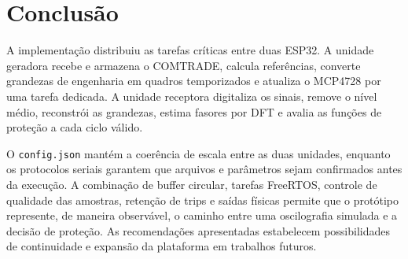 \section{Conclusão}

A implementação distribuiu as tarefas críticas entre duas ESP32. A unidade geradora recebe e armazena o COMTRADE, calcula referências, converte grandezas de engenharia em quadros temporizados e atualiza o MCP4728 por uma tarefa dedicada. A unidade receptora digitaliza os sinais, remove o nível médio, reconstrói as grandezas, estima fasores por DFT e avalia as funções de proteção a cada ciclo válido.

O \texttt{config.json} mantém a coerência de escala entre as duas unidades, enquanto os protocolos seriais garantem que arquivos e parâmetros sejam confirmados antes da execução. A combinação de buffer circular, tarefas FreeRTOS, controle de qualidade das amostras, retenção de trips e saídas físicas permite que o protótipo represente, de maneira observável, o caminho entre uma oscilografia simulada e a decisão de proteção. As recomendações apresentadas estabelecem possibilidades de continuidade e expansão da plataforma em trabalhos futuros.
